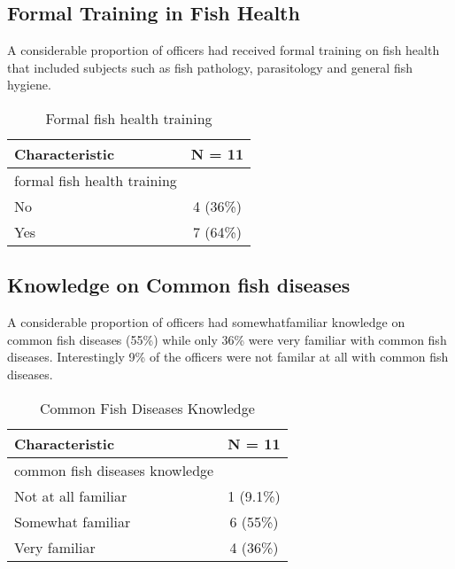 \documentclass[
  letterpaper,
  DIV=11,
  numbers=noendperiod]{scrartcl}
\begin{document}
\subsection{Formal Training in Fish
Health}\label{formal-training-in-fish-health}

A considerable proportion of officers had received formal training on
fish health that included subjects such as fish pathology, parasitology
and general fish hygiene.

\begin{longtable}[]{@{}lc@{}}

\caption{\label{tbl-fhealth}Formal fish health training}

\tabularnewline

\toprule\noalign{}
\textbf{Characteristic} & \textbf{N = 11} \\
\midrule\noalign{}
\endhead
\bottomrule\noalign{}
\endlastfoot
formal fish health training & \\
No & 4 (36\%) \\
Yes & 7 (64\%) \\

\end{longtable}

\subsection{Knowledge on Common fish
diseases}\label{knowledge-on-common-fish-diseases}

A considerable proportion of officers had somewhatfamiliar knowledge on
common fish diseases (55\%) while only 36\% were very familiar with
common fish diseases. Interestingly 9\% of the officers were not familar
at all with common fish diseases.

\begin{longtable}[]{@{}lc@{}}

\caption{\label{tbl-diseases}Common Fish Diseases Knowledge}

\tabularnewline

\toprule\noalign{}
\textbf{Characteristic} & \textbf{N = 11} \\
\midrule\noalign{}
\endhead
\bottomrule\noalign{}
\endlastfoot
common fish diseases knowledge & \\
Not at all familiar & 1 (9.1\%) \\
Somewhat familiar & 6 (55\%) \\
Very familiar & 4 (36\%) \\

\end{longtable}
\end{document}
